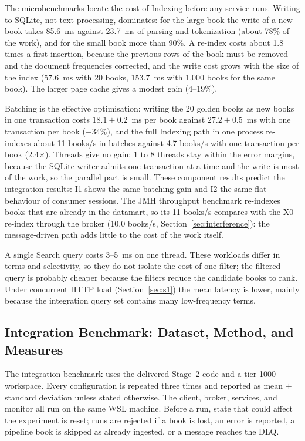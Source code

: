 \documentclass[12pt,a4paper]{article}
\begin{document}
The microbenchmarks locate the cost of Indexing before any service runs. Writing to SQLite, not
text processing, dominates: for the large book the write of a new book takes 85.6~ms against
23.7~ms of parsing and tokenization (about 78\% of the work), and for the small book more than
90\%. A re-index costs about 1.8 times a first insertion, because the previous rows of the book
must be removed and the document frequencies corrected, and the write cost grows with the size of
the index (57.6~ms with 20 books, 153.7~ms with 1,000 books for the same book). The larger page
cache gives a modest gain (4--19\%).

Batching is the effective optimisation: writing the 20 golden books as new books in one transaction
costs $18.1 \pm 0.2$~ms per book against $27.2 \pm 0.5$~ms with one transaction per book ($-34$\%), and the full Indexing path in one process re-indexes about 11 books/s in batches
against 4.7 books/s with one transaction per book (2.4$\times$). Threads give no gain: 1 to 8
threads stay within the error margins, because the SQLite writer admits one transaction at a time
and the write is most of the work, so the parallel part is small. These component results predict
the integration results: I1 shows the same batching gain and I2 the same flat behaviour of consumer
sessions. The JMH throughput benchmark re-indexes books that are already in the datamart, so its
11 books/s compares with the X0 re-index through the broker (10.0 books/s,
Section~\ref{sec:interference}): the message-driven path adds little to the cost of the work
itself.

A single Search query costs 3--5~ms on one thread. These workloads differ in terms and
selectivity, so they do not isolate the cost of one filter; the filtered query is probably cheaper
because the filters reduce the candidate books to rank. Under concurrent HTTP load (Section~\ref{sec:s1})
the mean latency is lower, mainly because the integration query set contains many low-frequency terms.

\subsection{Integration Benchmark: Dataset, Method, and Measures}
\label{sec:integration-method}

The integration benchmark uses the delivered Stage~2 code and a tier-1000 workspace. Every
configuration is repeated three times and reported as mean $\pm$ standard deviation unless stated
otherwise. The client, broker, services, and monitor all run on the same WSL machine. Before a run,
state that could affect the experiment is reset; runs are rejected if a book is lost, an error is
reported, a pipeline book is skipped as already ingested, or a message reaches the DLQ.
\end{document}
